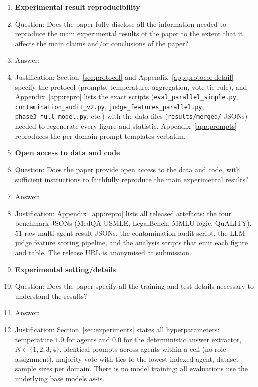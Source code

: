 \begin{enumerate}
\item {\bf Experimental result reproducibility}
    \item[] Question: Does the paper fully disclose all the information needed to reproduce the main experimental results of the paper to the extent that it affects the main claims and/or conclusions of the paper?
    \item[] Answer: \answerYes{}
    \item[] Justification: Section~\ref{sec:protocol} and Appendix~\ref{app:protocol-detail} specify the protocol (prompts, temperature, aggregation, vote-tie rule), and Appendix~\ref{app:repro} lists the exact scripts (\texttt{eval\_parallel\_simple.py}, \texttt{contamination\_audit\_v2.py}, \texttt{judge\_features\_parallel.py}, \texttt{phase3\_full\_model.py}, etc.) with the data files (\texttt{results/merged/} JSONs) needed to regenerate every figure and statistic. Appendix~\ref{app:prompts} reproduces the per-domain prompt templates verbatim.

\item {\bf Open access to data and code}
    \item[] Question: Does the paper provide open access to the data and code, with sufficient instructions to faithfully reproduce the main experimental results?
    \item[] Answer: \answerYes{}
    \item[] Justification: Appendix~\ref{app:repro} lists all released artefacts: the four benchmark JSONs (MedQA-USMLE, LegalBench, MMLU-logic, QuALITY), $51$ raw multi-agent result JSONs, the contamination-audit script, the LLM-judge feature scoring pipeline, and the analysis scripts that emit each figure and table. The release URL is anonymised at submission.

\item {\bf Experimental setting/details}
    \item[] Question: Does the paper specify all the training and test details necessary to understand the results?
    \item[] Answer: \answerYes{}
    \item[] Justification: Section~\ref{sec:experiments} states all hyperparameters: temperature $1.0$ for agents and $0.0$ for the deterministic answer extractor, $N{\in}\{1,2,3,4\}$, identical prompts across agents within a cell (no role assignment), majority vote with ties to the lowest-indexed agent, dataset sample sizes per domain. There is no model training; all evaluations use the underlying base models as-is.


\end{enumerate}
